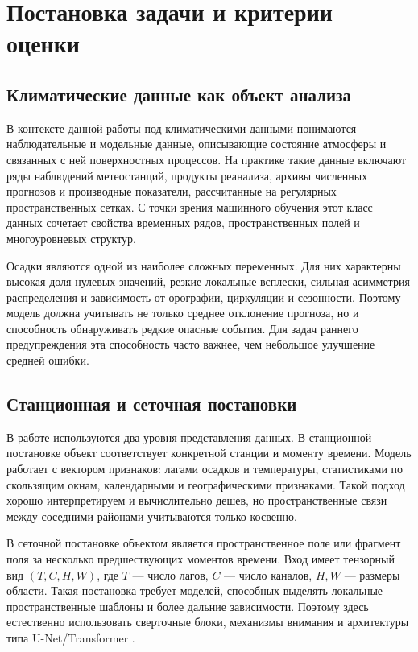 \chapter{Постановка задачи и критерии оценки}

\section{Климатические данные как объект анализа}

В контексте данной работы под климатическими данными понимаются наблюдательные и модельные данные, описывающие состояние атмосферы и связанных с ней поверхностных процессов. На практике такие данные включают ряды наблюдений метеостанций, продукты реанализа, архивы численных прогнозов и производные показатели, рассчитанные на регулярных пространственных сетках. С точки зрения машинного обучения этот класс данных сочетает свойства временных рядов, пространственных полей и многоуровневых структур.

Осадки являются одной из наиболее сложных переменных. Для них характерны высокая доля нулевых значений, резкие локальные всплески, сильная асимметрия распределения и зависимость от орографии, циркуляции и сезонности. Поэтому модель должна учитывать не только среднее отклонение прогноза, но и способность обнаруживать редкие опасные события. Для задач раннего предупреждения эта способность часто важнее, чем небольшое улучшение средней ошибки.

\section{Станционная и сеточная постановки}

В работе используются два уровня представления данных. В станционной постановке объект соответствует конкретной станции и моменту времени. Модель работает с вектором признаков: лагами осадков и температуры, статистиками по скользящим окнам, календарными и географическими признаками. Такой подход хорошо интерпретируем и вычислительно дешев, но пространственные связи между соседними районами учитываются только косвенно.

В сеточной постановке объектом является пространственное поле или фрагмент поля за несколько предшествующих моментов времени. Вход имеет тензорный вид \((T,C,H,W)\), где \(T\) — число лагов, \(C\) — число каналов, \(H,W\) — размеры области. Такая постановка требует моделей, способных выделять локальные пространственные шаблоны и более дальние зависимости. Поэтому здесь естественно использовать сверточные блоки, механизмы внимания и архитектуры типа U-Net/Transformer \cite{unet2015,vit2021,convnext2022}.

